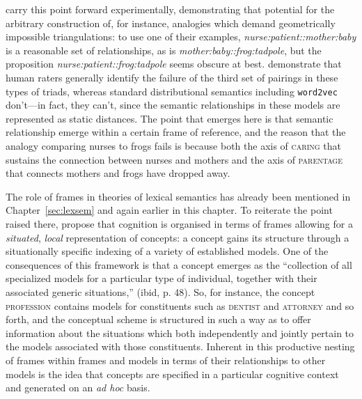 \cite{ChenEA2017} carry this point forward experimentally, demonstrating that potential for the arbitrary construction of, for instance, analogies which demand geometrically impossible triangulations: to use one of their examples, \emph{nurse:patient::mother:baby} is a reasonable set of relationships, as is \emph{mother:baby::frog:tadpole}, but the proposition \emph{nurse:patient::frog:tadpole} seems obscure at best.  \citeauthor{ChenEA2017} demonstrate that human raters generally identify the failure of the third set of pairings in these types of triads, whereas standard distributional semantics including \texttt{word2vec} don't---in fact, they can't, since the semantic relationships in these models are represented as static distances.  The point that emerges here is that semantic relationship emerge within a certain frame of reference, and the reason that the analogy comparing nurses to frogs fails is because both the axis of \textsc{caring} that sustains the connection between nurses and mothers and the axis of \textsc{parentage} that connects mothers and frogs have dropped away.

The role of frames in theories of lexical semantics has already been mentioned in Chapter~\ref{sec:lexsem} and again earlier in this chapter.  To reiterate the point raised there, \cite{BarsalouEA1993} propose that cognition is organised in terms of frames allowing for a \emph{situated}, \emph{local} representation of concepts: a concept gains its structure through a situationally specific indexing of a variety of established models.  One of the consequences of this framework is that a concept emerges as the ``collection of all specialized models for a particular type of individual, together with their associated generic situations,'' (ibid, p. 48).  So, for instance, the concept \textsc{profession} contains models for constituents such as \textsc{dentist} and \textsc{attorney} and so forth, and the conceptual scheme is structured in such a way as to offer information about the situations which both independently and jointly pertain to the models associated with those constituents.  Inherent in this productive nesting of frames within frames and models in terms of their relationships to other models is the idea that concepts are specified in a particular cognitive context and generated on an \emph{ad hoc} basis.


